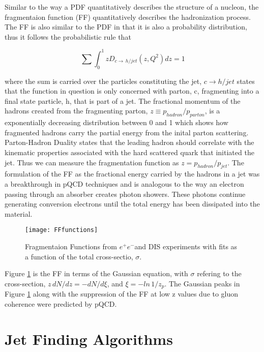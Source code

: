 Similar to the way a PDF quantitatively describes the structure of a nucleon, the fragmentaion function (FF) quantitatively describes the hadronization process.  The FF is also similar to the PDF in that it is also a probability distribution, thus it follows the probabilistic rule that

\begin{equation}
\sum \int_{0}^{1} z D_{c \rightarrow \, h/jet} (z,Q^{2})dz = 1
\label{eq:FFRule}
\end{equation}

\noindent
where the sum is carried over the particles constituting the jet, $c \rightarrow h/jet$ states that the function in question is only concerned with parton, c, fragmenting into a final state particle, h, that is part of a jet.  The fractional momentum of the hadrons created from the fragmenting parton, $z \equiv p_{hadron} / p_{parton}$, is a exponentially decreasing distribution between 0 and 1 which shows how fragmented hadrons carry the partial energy from the inital parton scattering.  Parton-Hadron Duality\cite{Jenkovszky:2012dc} states that the leading hadron should correlate with the kinematic properties associated with the hard scattered quark that initiated the jet.  Thus we can measure the fragmentation function as $z = p_{hadron} / p_{jet}$.  The formulation of the FF as the fractional energy carried by the hadrons in a jet was a breakthrough in pQCD techniques and is analogous to the way an electron passing through an absorber creates photon showers. These photons continue generating conversion electrons until the total energy has been dissipated into the material.

\begin{figure}[h]
\texttt{[image: FFfunctions]}
\centering
\caption{Fragmentaion Functions from $e^{+}e^{-}$and DIS experiments with fits\cite{rak_tannenbaum_2013} as a function of the total cross-sectio, $\sigma$.}
\label{fig:FFfunc}
\end{figure}


Figure \ref{fig:FFfunc} is the FF in terms of the Gaussian equation, with $\sigma$ refering to the cross-section, $z \, dN/dz = - dN /d \xi $, and $\xi = -ln  \,1/z_{p}$. The Gaussian peaks in Figure \ref{fig:FFfunc} along with the suppression of the FF at low z values due to gluon coherence were predicted by pQCD. 

\section{Jet Finding Algorithms}

